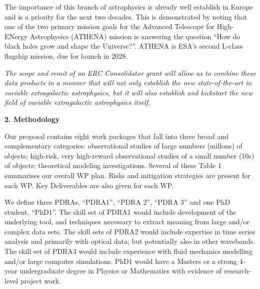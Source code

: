 \documentclass[oneside, a4paper, onecolumn, 11pt]{article}
\begin{document}
\smallskip
\smallskip
\noindent
The importance of this branch of astrophysics is already well
establish in Europe and is a priority for the next two decades. This
is demonstrated by noting that one of the two primary mission goals
for the Advanced Telescope for High-ENergy Astrophysics (ATHENA) mission 
is answering the question ``How do black holes grow and shape the
Universe?''.  ATHENA is ESA's second L-class flagship mission, due for
launch in 2028.


\smallskip
\smallskip
\noindent
{\it The scope and remit of an ERC Consolidator grant will allow us to
combine these data products in a manner that will not only establish
the new state-of-the-art in variable extragalactic astrophysics, but it 
will also establish and kickstart the new field of variable extragalactic
astrophysics itself.}




\medskip
\medskip
\noindent
\large
{\bf{\textcolor{Cerulean}{2. Methodology}}}
\normalsize

\noindent
Our proposal contains eight work packages that fall into three broad and 
complementary categories: observational studies of large numbers
(millons) of objects; high-risk, very high-reward observational
studies of a small number (10s) of objects; theoretical modeling
investigations. Several of these 
Table 1 summarises our overall WP plan. 
Risks and mitigation strategies are present for each WP. 
Key Deliverables are also given for each WP. 

\smallskip
\smallskip
\noindent
We define three PDRAs, ``PDRA1'', ``PDRA 2'', ``PDRA 3'' and one PhD student, ``PhD1''.  
The skill set of PDRA1 would include development of the underlying tool, and 
techniques necessary to extract meaning from large and/or complex data sets. 
The skill sets of PDRA2 would include expertise in time series analysis and 
primarily with optical data, but potentially also in other wavebands. 
The skill set of PDRA3 would include experience with fluid mechanics modelling and/or 
large computer simulations. 
PhD1 would have a Masters or a strong 4-year undergraduate degree in Physics or 
Mathematics with evidence of research-level project work.  
\end{document}
